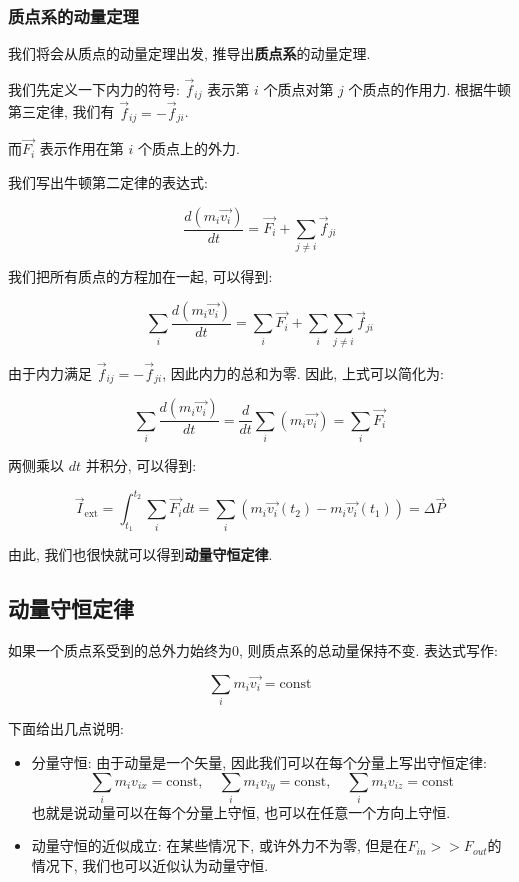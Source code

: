 \documentclass[
  a4paper,
]{ctexrep}
\providecommand{\tightlist}{%
  \setlength{\itemsep}{0pt}\setlength{\parskip}{0pt}}
\begin{document}
\subsubsection{质点系的动量定理}\label{ux8d28ux70b9ux7cfbux7684ux52a8ux91cfux5b9aux7406}

我们将会从质点的动量定理出发, 推导出\textbf{质点系}的动量定理.

我们先定义一下内力的符号: \(\vec{f}_{ij}\) 表示第 \(i\) 个质点对第 \(j\)
个质点的作用力. 根据牛顿第三定律, 我们有
\(\vec{f}_{ij} = -\vec{f}_{ji}\).

而\(\vec{F_i}\) 表示作用在第 \(i\) 个质点上的外力.

我们写出牛顿第二定律的表达式:

\[
\frac{d(m_i \vec{v_i})}{dt} = \vec{F_i} + \sum_{j \neq i} \vec{f}_{ji}
\]

我们把所有质点的方程加在一起, 可以得到:

\[
\sum_i \frac{d(m_i \vec{v_i})}{dt} = \sum_i \vec{F_i} + \sum_i \sum_{j \neq i} \vec{f}_{ji}
\]

由于内力满足 \(\vec{f}_{ij} = -\vec{f}_{ji}\), 因此内力的总和为零. 因此,
上式可以简化为:

\[
\sum_i \frac{d(m_i \vec{v_i})}{dt} = \frac{d}{dt} \sum_i (m_i \vec{v_i}) = \sum_i \vec{F_i}
\]

两侧乘以 \(dt\) 并积分, 可以得到:

\[
\vec{I}_\text{ext} = \int_{t_1}^{t_2} \sum_i \vec{F_i} dt = \sum_i (m_i \vec{v_i}(t_2) - m_i \vec{v_i}(t_1)) = \Delta \vec{P}
\]

由此, 我们也很快就可以得到\textbf{动量守恒定律}.

\subsection{动量守恒定律}\label{ux52a8ux91cfux5b88ux6052ux5b9aux5f8b}

如果一个质点系受到的总外力始终为\(0\), 则质点系的总动量保持不变.
表达式写作:

\[
\sum_i m_i \vec{v_i} = \text{const}
\]

下面给出几点说明:

\begin{itemize}
\tightlist
\item
  分量守恒: 由于动量是一个矢量, 因此我们可以在每个分量上写出守恒定律: \[
  \sum_i m_i v_{ix} = \text{const}, \quad \sum_i m_i v_{iy} = \text{const}, \quad \sum_i m_i v_{iz} = \text{const}
  \] 也就是说动量可以在每个分量上守恒, 也可以在任意一个方向上守恒.
\item
  动量守恒的近似成立: 在某些情况下, 或许外力不为零,
  但是在\(F_{in} >> F_{out}\)的情况下, 我们也可以近似认为动量守恒.
\end{itemize}
\end{document}
